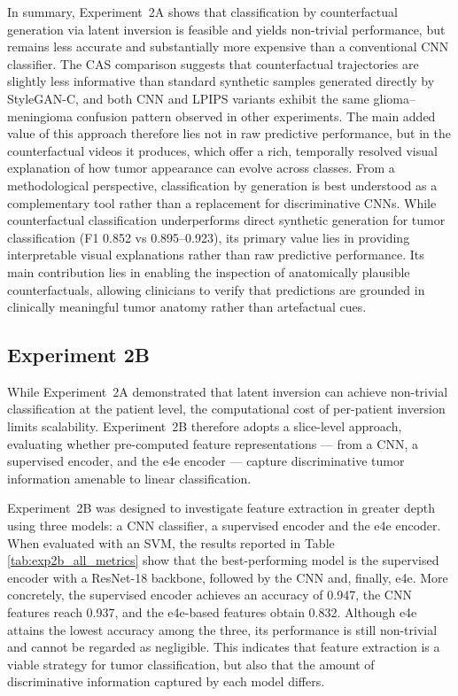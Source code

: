 In summary, Experiment~2A shows that classification by counterfactual generation via latent inversion is feasible and yields non-trivial performance, but remains less accurate and substantially more expensive than a conventional CNN classifier. The CAS comparison suggests that counterfactual trajectories are slightly less informative than standard synthetic samples generated directly by StyleGAN-C, and both CNN and LPIPS variants exhibit the same glioma--meningioma confusion pattern observed in other experiments. The main added value of this approach therefore lies not in raw predictive performance, but in the counterfactual videos it produces, which offer a rich, temporally resolved visual explanation of how tumor appearance can evolve across classes. From a methodological perspective, classification by generation is best understood as a complementary tool rather than a replacement for discriminative CNNs. While counterfactual classification underperforms direct synthetic generation for tumor classification (F1 0.852 vs 0.895--0.923), its primary value lies in providing interpretable visual explanations rather than raw predictive performance. Its main contribution lies in enabling the inspection of anatomically plausible counterfactuals, allowing clinicians to verify that predictions are grounded in clinically meaningful tumor anatomy rather than artefactual cues. \\



\subsection{Experiment 2B}

While Experiment~2A demonstrated that latent inversion can achieve non-trivial classification at the patient level, the computational cost of per-patient inversion limits scalability. Experiment~2B therefore adopts a slice-level approach, evaluating whether pre-computed feature representations --- from a CNN, a supervised encoder, and the e4e encoder --- capture discriminative tumor information amenable to linear classification.

Experiment~2B was designed to investigate feature extraction in greater depth using three models: a CNN classifier, a supervised encoder and the e4e encoder. When evaluated with an SVM, the results reported in Table \ref{tab:exp2b_all_metrics} show that the best-performing model is the supervised encoder with a ResNet-18 backbone, followed by the CNN and, finally, e4e. More concretely, the supervised encoder achieves an accuracy of 0.947, the CNN features reach 0.937, and the e4e-based features obtain 0.832. Although e4e attains the lowest accuracy among the three, its performance is still non-trivial and cannot be regarded as negligible. This indicates that feature extraction is a viable strategy for tumor classification, but also that the amount of discriminative information captured by each model differs.\\


